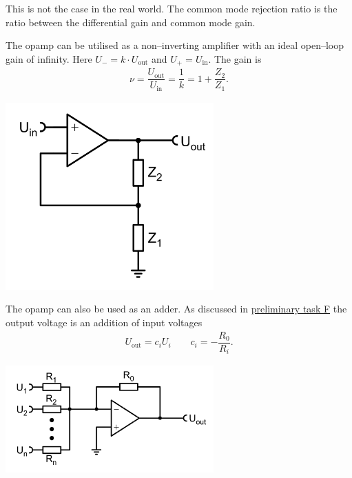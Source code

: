 \documentclass[a4paper,10pt]{article}
\newenvironment{Figure}
        {\par\medskip\noindent\minipage{\linewidth}}
        {\endminipage\par\medskip}
\numberwithin{equation}{section}
\begin{document}
\begin{multicols}{2}
\begin{enumerate}[label=--]
                        This is not the case in the real world.
                        The common mode rejection ratio is the ratio between the differential gain and common mode gain.
        \end{enumerate}
        The opamp can be utilised as a non--inverting amplifier with an ideal open--loop gain of infinity.
        Here $U_-=k\cdot U_\text{out}$ and $U_+=U_\text{in}$.
        The gain is
        \begin{align} 
                \nu =\dfrac{U_\text{out}}{U_\text{in}}=\dfrac{1}{k}=1+\dfrac{Z_2}{Z_1}
        .\end{align} 
        \begin{Figure}
                \centering
                \includegraphics[width=0.6\textwidth]{noninverting_amp.png}
                 \label{fig:non--inverting amplifier}
        \end{Figure}
        \noindent The opamp can also be used as an adder.
        As discussed in \hyperref[pre:F]{preliminary task F} the output voltage is an addition of input voltages
        \begin{align} 
                U_\text{out}=c_iU_i\qquad c_i=-\dfrac{R_0}{R_i}
        .\end{align} 
        \begin{Figure}
                \centering
                \includegraphics[width=0.6\textwidth]{adder.png}

\end{Figure}
\end{multicols}
\end{document}
